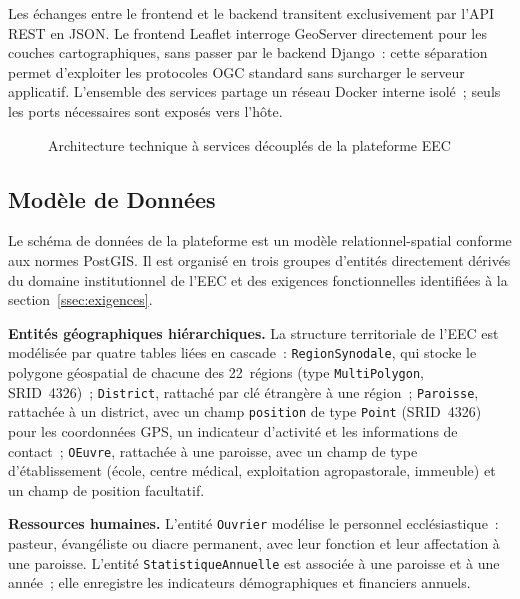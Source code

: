 Les échanges entre le frontend et le backend transitent exclusivement par
l'API REST en JSON. Le frontend Leaflet interroge GeoServer directement
pour les couches cartographiques, sans passer par le backend Django~: cette
séparation permet d'exploiter les protocoles OGC standard sans surcharger
le serveur applicatif. L'ensemble des services partage un réseau Docker
interne isolé~; seuls les ports nécessaires sont exposés vers l'hôte.

\begin{figure}[H]
  \centering
  \caption{Architecture technique à services découplés de la plateforme EEC}
  \label{fig:diag-archi}
\end{figure}

\subsection{Modèle de Données}
\label{ssec:modele-bd}

Le schéma de données de la plateforme est un modèle relationnel-spatial
conforme aux normes PostGIS. Il est organisé en trois groupes d'entités
directement dérivés du domaine institutionnel de l'EEC et des exigences
fonctionnelles identifiées à la section~\ref{ssec:exigences}.

\noindent\textbf{Entités géographiques hiérarchiques.}
La structure territoriale de l'EEC est modélisée par quatre tables liées
en cascade~: \texttt{RegionSynodale}, qui stocke le polygone géospatial
de chacune des 22~régions (type \texttt{MultiPolygon}, SRID~4326)~;
\texttt{District}, rattaché par clé étrangère à une région~; \texttt{Paroisse},
rattachée à un district, avec un champ \texttt{position} de type
\texttt{Point} (SRID~4326) pour les coordonnées GPS, un indicateur
d'activité et les informations de contact~; \texttt{OEuvre}, rattachée à
une paroisse, avec un champ de type d'établissement (école, centre médical,
exploitation agropastorale, immeuble) et un champ de position facultatif.

\noindent\textbf{Ressources humaines.}
L'entité \texttt{Ouvrier} modélise le personnel ecclésiastique~: pasteur,
évangéliste ou diacre permanent, avec leur fonction et leur affectation à
une paroisse. L'entité \texttt{StatistiqueAnnuelle} est associée à une
paroisse et à une année~; elle enregistre les indicateurs démographiques
et financiers annuels.

